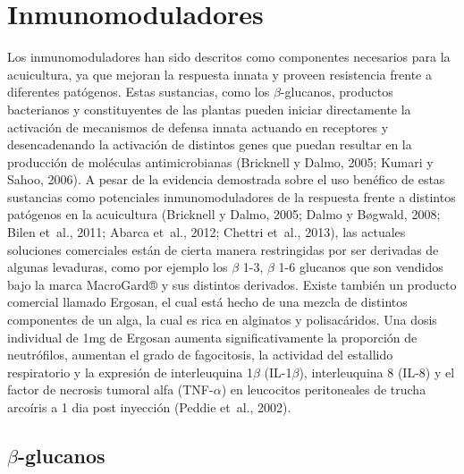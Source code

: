 \documentclass[12pt,letterpaper,oneside]{scrbook}
\begin{document}
\section{Inmunomoduladores}

Los inmunomoduladores han sido descritos como componentes necesarios
para la acuicultura, ya que mejoran la respuesta innata y proveen
resistencia frente a diferentes patógenos. Estas sustancias, como los
\(\beta\)-glucanos, productos bacterianos y constituyentes de las
plantas pueden iniciar directamente la activación de mecanismos de
defensa innata actuando en receptores y desencadenando la activación de
distintos genes que puedan resultar en la producción de moléculas
antimicrobianas (Bricknell y Dalmo, 2005; Kumari y Sahoo, 2006). A pesar
de la evidencia demostrada sobre el uso benéfico de estas sustancias
como potenciales inmunomoduladores de la respuesta frente a distintos
patógenos en la acuicultura (Bricknell y Dalmo, 2005; Dalmo y Bøgwald,
2008; Bilen et~al., 2011; Abarca et~al., 2012; Chettri et~al., 2013),
las actuales soluciones comerciales están de cierta manera restringidas
por ser derivadas de algunas levaduras, como por ejemplo los \(\beta\)
1-3, \(\beta\) 1-6 glucanos que son vendidos bajo la marca MacroGard® y
sus distintos derivados. Existe también un producto comercial llamado
Ergosan, el cual está hecho de una mezcla de distintos componentes de un
alga, la cual es rica en alginatos y polisacáridos. Una dosis individual
de 1mg de Ergosan aumenta significativamente la proporción de
neutrófilos, aumentan el grado de fagocitosis, la actividad del
estallido respiratorio y la expresión de interleuquina 1\(\beta\)
(IL-1\(\beta\)), interleuquina 8 (IL-8) y el factor de necrosis tumoral
alfa (TNF-\(\alpha\)) en leucocitos peritoneales de trucha arcoíris a 1
dia post inyección (Peddie et~al., 2002).

\subsection{$\beta$-glucanos}
\end{document}
